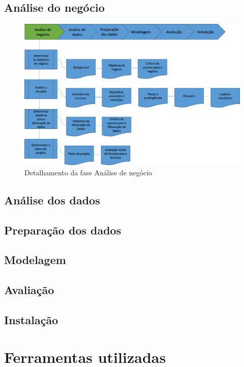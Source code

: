 \subsection*{Análise do negócio}

\begin{figure}[H]
	\includegraphics[scale=0.8]{img/CRISP-DM-Analise-de-negocio.png}
	\caption{Detalhamento da fase Análise de negócio}
	\label{img:CRISP-DM-analise-de-negocio}
\end{figure}


\subsection*{Análise dos dados}
\subsection*{Preparação dos dados}
\subsection*{Modelagem}
\subsection*{Avaliação}
\subsection*{Instalação}

\section{Ferramentas utilizadas}